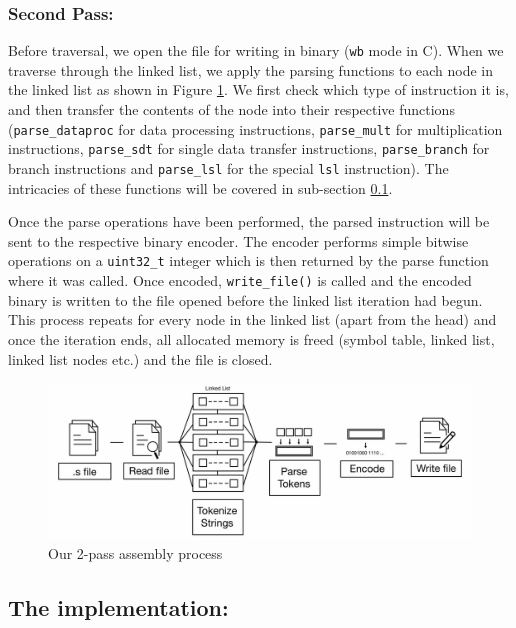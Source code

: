 \documentclass[a4paper]{article}
\begin{document}
\subsubsection{Second Pass: }
Before traversal, we open the file for writing in binary (\verb|wb| mode in C). When we traverse through the linked list, we apply the parsing functions to each node in the linked list as shown in Figure \ref{fig:assembler}. We first check which type of instruction it is, and then transfer the contents of the node into their respective functions (\verb|parse_dataproc| for data processing instructions, \verb|parse_mult| for multiplication instructions, \verb|parse_sdt| for single data transfer instructions, \verb|parse_branch| for branch instructions and \verb|parse_lsl| for the special \verb|lsl| instruction). The intricacies of these functions will be covered in sub-section \ref{Assembler implementation}. 

Once the parse operations have been performed, the parsed instruction will be sent to the respective binary encoder. The encoder performs simple bitwise operations on a \verb|uint32_t| integer which is then returned by the parse function where it was called. Once encoded, \verb|write_file()| is called and the encoded binary is written to the file opened before the linked list iteration had begun. This process repeats for every node in the linked list (apart from the head) and once the iteration ends, all allocated memory is freed (symbol table, linked list, linked list nodes etc.) and the file is closed.

\begin{figure}[htp]
    \centering
    \includegraphics[width=15cm]{assembler_flow.jpg}
    \caption{Our 2-pass assembly process}
    \label{fig:assembler}
\end{figure}

\subsection{The implementation:}\label{Assembler implementation}
\end{document}
